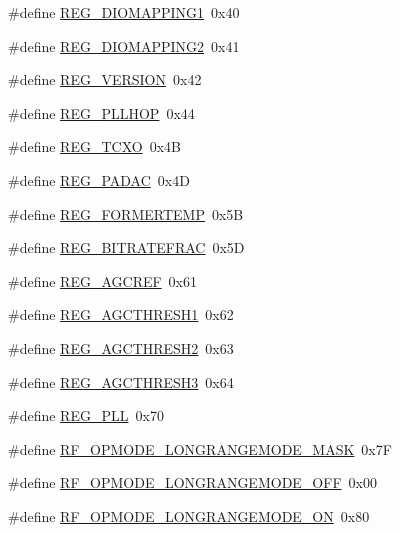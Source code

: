 \begin{DoxyCompactItemize}
\item 
\#define \hyperlink{sx1276Regs-Fsk_8h_ac16d5678e98fa6ab73655240a11f9b69}{R\+E\+G\+\_\+\+D\+I\+O\+M\+A\+P\+P\+I\+N\+G1}~0x40
\item 
\#define \hyperlink{sx1276Regs-Fsk_8h_aec8b1ddf72925f502675593fabcc469f}{R\+E\+G\+\_\+\+D\+I\+O\+M\+A\+P\+P\+I\+N\+G2}~0x41
\item 
\#define \hyperlink{sx1276Regs-Fsk_8h_aa7075c0ae73420685bb4278ee580f3fa}{R\+E\+G\+\_\+\+V\+E\+R\+S\+I\+ON}~0x42
\item 
\#define \hyperlink{sx1276Regs-Fsk_8h_a6a8f2748b149c14533e877f06e4720f3}{R\+E\+G\+\_\+\+P\+L\+L\+H\+OP}~0x44
\item 
\#define \hyperlink{sx1276Regs-Fsk_8h_a57f595889f6a6af755ecc9b3bb5b4c3d}{R\+E\+G\+\_\+\+T\+C\+XO}~0x4B
\item 
\#define \hyperlink{sx1276Regs-Fsk_8h_ad64f0f69f548f51e16be4a9a07d980cd}{R\+E\+G\+\_\+\+P\+A\+D\+AC}~0x4D
\item 
\#define \hyperlink{sx1276Regs-Fsk_8h_a1c2bc2d26e0f676a4f012e975f1d86f2}{R\+E\+G\+\_\+\+F\+O\+R\+M\+E\+R\+T\+E\+MP}~0x5B
\item 
\#define \hyperlink{sx1276Regs-Fsk_8h_a1e0117bd4c660d60afc9d119840f9e26}{R\+E\+G\+\_\+\+B\+I\+T\+R\+A\+T\+E\+F\+R\+AC}~0x5D
\item 
\#define \hyperlink{sx1276Regs-Fsk_8h_a3dc004091d7cb3015aff5967e09b77d8}{R\+E\+G\+\_\+\+A\+G\+C\+R\+EF}~0x61
\item 
\#define \hyperlink{sx1276Regs-Fsk_8h_a1d0f8f390ec3b351e10e37e7258ca6df}{R\+E\+G\+\_\+\+A\+G\+C\+T\+H\+R\+E\+S\+H1}~0x62
\item 
\#define \hyperlink{sx1276Regs-Fsk_8h_ac3b7b366f9a287e32a0be6724909f644}{R\+E\+G\+\_\+\+A\+G\+C\+T\+H\+R\+E\+S\+H2}~0x63
\item 
\#define \hyperlink{sx1276Regs-Fsk_8h_a1686f2ccb6d060e425194a9414fd7ca3}{R\+E\+G\+\_\+\+A\+G\+C\+T\+H\+R\+E\+S\+H3}~0x64
\item 
\#define \hyperlink{sx1276Regs-Fsk_8h_aa5110ddd4aaa720908be259b5a4af489}{R\+E\+G\+\_\+\+P\+LL}~0x70
\item 
\#define \hyperlink{sx1276Regs-Fsk_8h_afd99a116c626b5579054d37c640e175a}{R\+F\+\_\+\+O\+P\+M\+O\+D\+E\+\_\+\+L\+O\+N\+G\+R\+A\+N\+G\+E\+M\+O\+D\+E\+\_\+\+M\+A\+SK}~0x7F
\item 
\#define \hyperlink{sx1276Regs-Fsk_8h_a856e634d884238e300fdf87a2557d670}{R\+F\+\_\+\+O\+P\+M\+O\+D\+E\+\_\+\+L\+O\+N\+G\+R\+A\+N\+G\+E\+M\+O\+D\+E\+\_\+\+O\+FF}~0x00
\item 
\#define \hyperlink{sx1276Regs-Fsk_8h_a1775751bd57cbba5d752ebf2e03c6e1b}{R\+F\+\_\+\+O\+P\+M\+O\+D\+E\+\_\+\+L\+O\+N\+G\+R\+A\+N\+G\+E\+M\+O\+D\+E\+\_\+\+ON}~0x80

\end{DoxyCompactItemize}
